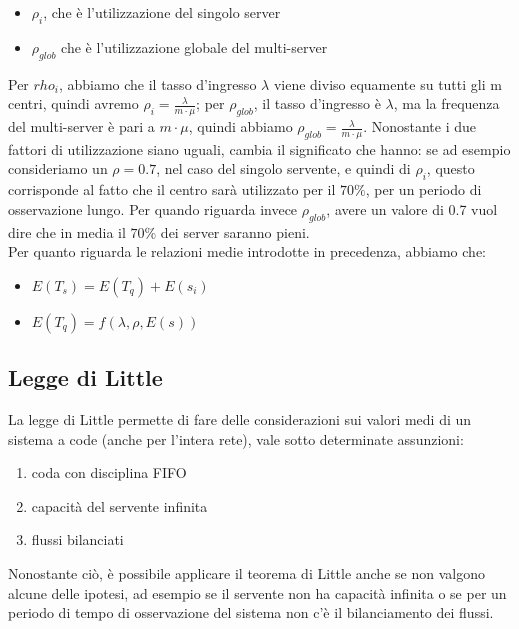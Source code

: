\documentclass{article}
\begin{document}
\begin{itemize}
\item $\rho_i$, che è l'utilizzazione del singolo server
\item $\rho_{glob}$ che è l'utilizzazione globale del multi-server
\end{itemize}
Per $rho_i$, abbiamo che il tasso d'ingresso $\lambda$ viene diviso equamente su tutti gli m centri, quindi avremo $\rho_i = \frac{\lambda}{m\cdot \mu}$; per $\rho_{glob}$, il tasso d'ingresso è $\lambda$, ma la frequenza del multi-server è pari a $m\cdot \mu$, quindi abbiamo $\rho_{glob} = \frac{\lambda}{m\cdot \mu}$. Nonostante i due fattori di utilizzazione siano uguali, cambia il significato che hanno: se ad esempio consideriamo un $\rho = 0.7$, nel caso del singolo servente, e quindi di $\rho_i$, questo corrisponde al fatto che il centro sarà utilizzato per il $70\%$, per un periodo di osservazione lungo. Per quando riguarda invece $\rho_{glob}$, avere un valore di 0.7 vuol dire che in media il $70\%$ dei server saranno pieni.\\ Per quanto riguarda le relazioni medie introdotte in precedenza, abbiamo che:
\begin{itemize}
\item $E(T_s) = E(T_q) + E(s_i)$
\item $E(T_q) = f(\lambda, \rho, E(s))$
\end{itemize}
\subsection{Legge di Little}
La legge di Little permette di fare delle considerazioni sui valori medi di un sistema a code (anche per l'intera rete), vale sotto determinate assunzioni:
\begin{enumerate}
\item coda con disciplina FIFO
\item capacità del servente infinita
\item flussi bilanciati
\end{enumerate}
Nonostante ciò, è possibile applicare il teorema di Little anche se non valgono alcune delle ipotesi, ad esempio se il servente non ha capacità infinita o se per un periodo di tempo di osservazione del sistema non c'è il bilanciamento dei flussi.\\
\end{document}
